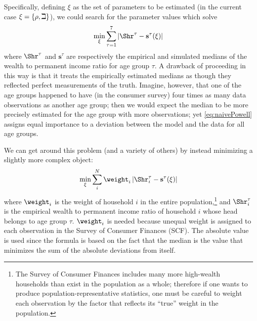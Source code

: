 Specifically, defining $\xi$ as the set of parameters
to be estimated (in the current case $\xi =\{\rho ,\beth\}$), we could search for
the parameter values which solve
  \begin{equation}
    \begin{gathered}
      \begin{aligned}
        \min_{\xi} \sum_{\tau=1}^{7} |\Shr^{\tau} -\mathbf{s}^{\tau}(\xi)|  \label{eq:naivePowell}
      \end{aligned}
    \end{gathered}
  \end{equation}
where $\Shr^{\tau }$ and $\mathbf{s}^{\tau}$ are respectively the empirical
and simulated medians of the wealth to permanent income ratio for age group $\tau$.
A drawback of proceeding in this way is that it treats the empirically
estimated medians as though they reflected perfect measurements of the
truth. Imagine, however, that one of the age groups happened to have
(in the consumer survey) four times as many data observations as
another age group; then we would expect the median to be more
precisely estimated for the age group with more observations; yet
\eqref{eq:naivePowell} assigns equal importance to a deviation between
the model and the data for all age groups.

We can get around this problem (and a variety of others) by instead minimizing a slightly more complex object:
  \begin{equation}
    \min_{\xi}\sum_{i}^{N}\weight _{i}\left|\Shr_{i}^{\tau }-\mathbf{s}^{\tau}(\xi )\right|\label{eq:StructEstim}
  \end{equation}
where $\weight_{i}$ is the weight of household $i$ in the entire
population,\footnote{The Survey of Consumer Finances includes many
  more high-wealth households than exist in the population as a whole;
  therefore if one wants to produce population-representative
  statistics, one must be careful to weight each observation by the
  factor that reflects its ``true'' weight in the population.} and
$\Shr_{i}^{\tau }$ is the empirical wealth to permanent income
ratio of household $i$ whose head belongs to age group
$\tau$. $\weight _{i}$ is needed because unequal weight is assigned to
each observation in the Survey of Consumer Finances (SCF). The
absolute value is used since the formula is based on the fact that the
median is the value that minimizes the sum of the absolute deviations
from itself.


